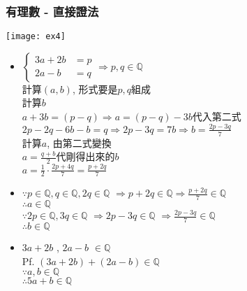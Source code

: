 \documentclass{beamer}
\begin{document}
{\begin{CJK*}{UTF8}{bkai}
\begin{frame}
 \frametitle{有理數 - 直接證法}
 \texttt{[image: ex4]}
 \begin{itemize}
  \item 
$
\begin{cases}
 3a+2b &= p \\
 2a-b  &= q
\end{cases}
\Rightarrow p,q\in \mathbb{Q}
$\\
計算$(a,b)$, 形式要是$p,q$組成\\
計算$b$\\ 
$
a+3b=(p-q) \Rightarrow a = (p-q)-3b
$代入第二式\\
$
2p-2q-6b-b = q \Rightarrow 2p-3q = 7b \Rightarrow b = \frac{2p-3q}{7}
$ \\ 
計算$a$, 由第二式變換 \\
$
a = \frac{q+b}{2}
$代剛得出來的$b$\\
$
a=
\frac{1}{2}\cdot \frac{2p+4q}{7}
=
\frac{p+2q}{7}
$
 \end{itemize}
\end{frame}

\begin{frame}
 \begin{itemize}
  \item 
 $\because  p\in \mathbb{Q}, q\in \mathbb{Q}, 2q\in \mathbb{Q}$
 $\Rightarrow p+2q\in \mathbb{Q} \Rightarrow \frac{p+2q}{7}\in \mathbb{Q}$
 \\$\therefore a\in \mathbb{Q}$
 \\[0.5cm]
 $\because 2p\in \mathbb{Q}, 3q\in \mathbb{Q}$
 $\Rightarrow 2p-3q \in \mathbb{Q}$
 $\Rightarrow \frac{2p-3q}{7}\in \mathbb{Q}$
 \\
 $\therefore b\in \mathbb{Q}$


\item
 $3a+2b$ , $2a-b$ $\in\mathbb{Q}$\\
 Pf. $(3a+2b)+(2a-b)\in\mathbb{Q}$ \\
 $\because a, b\in \mathbb{Q} $\\
 $\therefore 5a+b\in\mathbb{Q}$

 \end{itemize}

 
\end{frame}




\end{CJK*}
}
\end{document}
